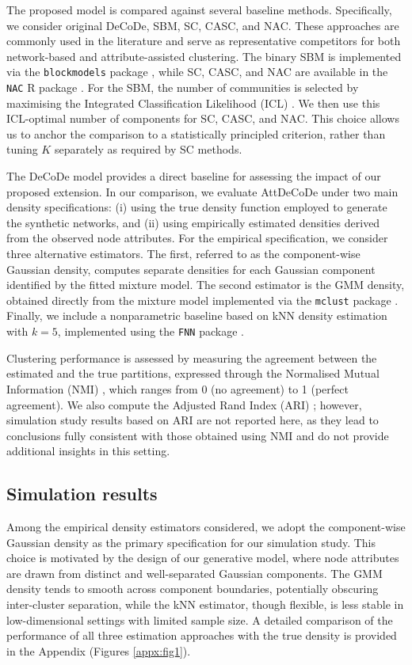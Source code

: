 \documentclass[11pt]{article}
\begin{document}
The proposed model is compared against several baseline methods.
Specifically, we consider original DeCoDe, SBM, SC, CASC, and NAC. These approaches are commonly used in the literature and serve as representative competitors for both network-based and attribute-assisted clustering. The binary SBM is implemented via the \texttt{blockmodels} package \citep{blockmodels}, while SC, CASC, and NAC are available in the \texttt{NAC} R package \citep{NAC}.
For the SBM, the number of communities is selected by maximising the Integrated Classification Likelihood (ICL) \citep{Come2015ModelLikelihood}. We then use this ICL-optimal number of components for SC, CASC, and NAC. This choice allows us to anchor the comparison to a statistically principled criterion, rather than tuning $K$ separately as required by SC methods.

The DeCoDe model provides a direct baseline for assessing the impact of our proposed extension. In our comparison, we evaluate AttDeCoDe under two main density specifications:
(i) using the true density function employed to generate the synthetic networks, and
(ii) using empirically estimated densities derived from the observed node attributes. For the empirical specification, we consider three alternative estimators. The first, referred to as the component-wise Gaussian density, computes separate densities for each Gaussian component identified by the fitted mixture model. 
The second estimator is the GMM density, obtained directly from the mixture model implemented via the \texttt{mclust} package \citep{mclust}. 
Finally, we include a nonparametric baseline based on kNN density estimation with $k = 5$, implemented using the \texttt{FNN} package \citep{FNN}.

Clustering performance is assessed by measuring the agreement between the estimated and the true partitions, expressed through the Normalised Mutual Information (NMI) \citep{Danon2005ComparingIdentification}, which ranges from 0 (no agreement) to 1 (perfect agreement). We also compute the Adjusted Rand Index (ARI) \citep{hubert1985comparing}; however, simulation study results based on ARI are not reported here, as they lead to conclusions fully consistent with those obtained using NMI and do not provide additional insights in this setting.

\subsection{Simulation results}

Among the empirical density estimators considered, we adopt the component-wise Gaussian density as the primary specification for our simulation study. This choice is motivated by the design of our generative model, where node attributes are drawn from distinct and well-separated Gaussian components. The GMM density tends to smooth across component boundaries, potentially obscuring inter-cluster separation, while the kNN estimator, though flexible, is less stable in low-dimensional settings with limited sample size.
A detailed comparison of the performance of all three estimation approaches with the true density is provided in the Appendix (Figures \ref{appx:fig1}).
\end{document}
